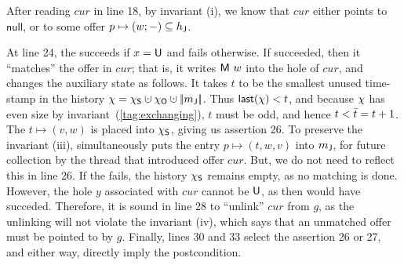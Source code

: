 
After reading $cur$ in line 18, by invariant (i), we know that $cur$
either points to $\mathsf{null}$, or to some offer $p \mapsto (w; -)
\subseteq h_{\mathsf{J}}$.




At line 24, the  succeeds if $x = {\mathsf{U}}$ and fails
otherwise. If  succeeded, then it ``matches'' the offer in $cur$;
that is, it writes ${\mathsf{M}\ w}$ into the hole of $cur$, and changes the
auxiliary state as follows. It takes $t$ to be the smallest unused
time-stamp in the history $\hist = \hists \hunion \histo \hunion
\mygather{\pending}$. Thus $\mathsf{last}(\chi) < t$, and because
$\chi$ has even size by invariant~(\ref{tag:exchanging}), $t$ must be
odd, and hence $t < \bar{t} = t+1$. The $t \mapsto (v, w)$ is placed
into $\chi_{\mathsf{S}}$, giving us assertion 26.  To preserve the invariant
(iii),  simultaneously puts the entry $p \mapsto (t, w, v)$ into
${m_{\mathsf{J}}}$, for future collection by the thread that introduced offer
$cur$. But, we do not need to reflect this in line 26.
%
If the  fails, the history $\chi_{\mathsf{S}}$ remains empty, as no matching is
done. However, the hole $y$ associated with $cur$ cannot be
${\mathsf{U}}$, as then  would have succeded.
%
Therefore, it is sound in line 28 to ``unlink'' $cur$ from $g$, as the
unlinking will not violate the invariant (iv), which says that an
unmatched offer must be pointed to by $g$.
%
Finally, lines 30 and 33 select the assertion 26 or 27, and either
way, directly imply the postcondition.
